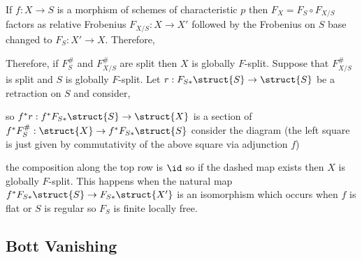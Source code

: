 \documentclass[12pt]{article}
\begin{document}
\begin{rmk}
If $f : X \to S$ is a morphism of schemes of characteristic $p$ then $F_X = F_S \circ F_{X/S}$ factors as relative Frobenius $F_{X/S} : X \to X'$ followed by the Frobenius on $S$ base changed to $F_S : X' \to X$. Therefore, 
\begin{center}
\end{center} 
Therefore, if $F_S^{\#}$ and $F_{X/S}^{\#}$ are split then $X$ is globally $F$-split. Suppose that $F_{X/S}^{\#}$ is split and $S$ is globally $F$-split. Let $r : F_{S*} \struct{S} \to \struct{S}$ be a retraction on $S$ and consider,
\begin{center}
\end{center}
so $f^* r : f^* F_{S*} \struct{S} \to \struct{X}$ is a section of $f^* F_S^{\#} : \struct{X} \to f^* F_{S*} \struct{S}$ consider the diagram (the left square is just given by commutativity of the above square via adjunction $f$)

\begin{center}
\end{center}
the composition along the top row is $\id$ so if the dashed map exists then $X$ is globally $F$-split. This happens when the natural map $f^* F_{S*} \struct{S} \to F_{S*} \struct{X'}$ is an isomorphism which occurs when $f$ is flat or $S$ is regular so $F_S$ is finite locally free. 
\end{rmk}

\subsection{Bott Vanishing}
\end{document}
